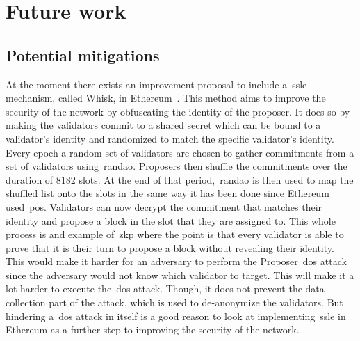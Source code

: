 

\section{Future work}\label{sec:future-works}

\subsection{Potential mitigations}\label{subsec:potential-mitigations}
At the moment there exists an improvement proposal
to include a~\gls{ssle} mechanism, called Whisk, in Ethereum~\cite{EthereumResearchSSLE2024}.
This method aims to improve the security of the network by obfuscating the identity of the proposer.
It does so by making the validators commit to a shared secret which can be bound to a validator's identity and randomized to match the specific validator's identity.
Every epoch a random set of validators are chosen to gather commitments from a set of validators using~\gls{randao}.
Proposers then shuffle the commitments over the duration of 8182 slots.
At the end of that period,~\gls{randao} is then used to map the shuffled list onto the slots in the same way it has been done since Ethereum used~\gls{pos}.
Validators can now decrypt the commitment that matches their identity and propose a block in the slot that they are assigned to.
This whole process is and example of~\gls{zkp} where the point is that every validator is able to prove that it is their turn to propose a block without revealing their identity.
This would make it harder
for an adversary to perform the Proposer~\gls{dos} attack since the adversary would not know which validator to target.
This will make it a lot harder to execute the~\gls{dos} attack.
Though, it does not prevent the data collection part of the attack, which is used to de-anonymize the validators.
But hindering a~\gls{dos} attack in itself is a good reason
to look at implementing~\gls{ssle} in Ethereum as a further step to improving the security of the network.
